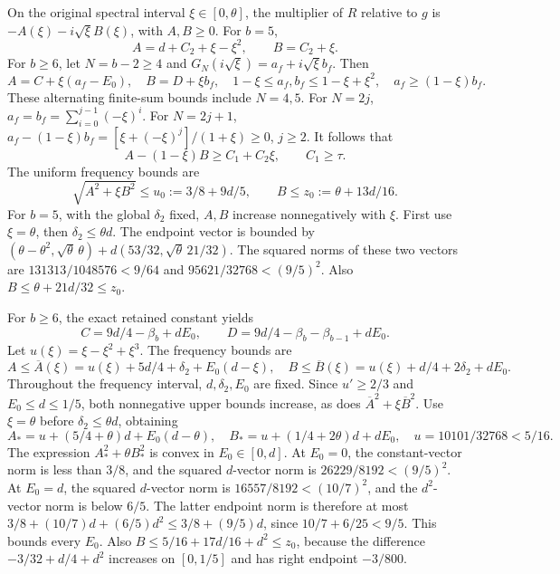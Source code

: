 On the original spectral interval \(\xi\in[0,\allowbreak \theta]\), the multiplier of \(R\) relative to \(g\) is
\(-A(\xi)-i\sqrt\xi B(\xi)\), with \(A,\allowbreak B\ge\allowbreak 0\).
For \(b=\allowbreak 5\),
\[
A=d+C_2+\xi-\xi^2,\qquad B=C_2+\xi.
\]
For \(b\ge\allowbreak 6\), let \(N=\allowbreak b-2\ge\allowbreak 4\) and
\(G_N(i\sqrt\xi)=\allowbreak a_f+i\sqrt\xi b_f\). Then
\[
A=C+\xi(a_f-E_0),\quad B=D+\xi b_f,
\quad 1-\xi\le a_f,b_f\le1-\xi+\xi^2,
\quad a_f\ge(1-\xi)b_f.
\tag{Q86.2.5}\label{eq:Q86:2.5}
\]
These alternating finite-sum bounds include \(N=\allowbreak 4,\allowbreak 5\).
For \(N=\allowbreak 2j\),
\(a_f=\allowbreak b_f=\allowbreak \sum_{i=\allowbreak 0}^{j-1}(-\xi)^i\).
For \(N=\allowbreak 2j+1\),
\(a_f-(1-\xi)b_f=\allowbreak [\xi+(-\xi)^j]/(1+\xi)\ge\allowbreak 0\), \(j\ge\allowbreak 2\).
It follows that
\[
A-(1-\xi)B\ge C_1+C_2\xi,\qquad C_1\ge\tau.
\tag{Q86.2.6}\label{eq:Q86:2.6}
\]
The uniform frequency bounds are
\[
\boxed{\sqrt{A^2+\xi B^2}\le u_0:=3/8+9d/5,
\qquad B\le z_0:=\theta+13d/16.}
\tag{Q86.2.7}\label{eq:Q86:2.7}
\]
For \(b=\allowbreak 5\), with the global \(\delta_2\) fixed, \(A,\allowbreak B\) increase nonnegatively with \(\xi\).
First use \(\xi=\allowbreak \theta\), then \(\delta_2\le\allowbreak \theta d\).
The endpoint vector is bounded by
\((\theta-\theta^2,\sqrt\theta\,\theta)
+d(53/32,\sqrt\theta\,21/32)\).
The squared norms of these two vectors are
\(131313/1048576<\allowbreak 9/64\) and \(95621/32768<\allowbreak (9/5)^2\).
Also \(B\le\allowbreak \theta+21d/32\le\allowbreak  z_0\).

For \(b\ge\allowbreak 6\), the exact retained constant yields
\[
C=9d/4-\beta_b+dE_0,\qquad
D=9d/4-\beta_b-\beta_{b-1}+dE_0.
\]
Let \(u(\xi)=\allowbreak \xi-\xi^2+\xi^3\). The frequency bounds are
\[
A\le\overline A(\xi)=u(\xi)+5d/4+\delta_2+E_0(d-\xi),
\quad
B\le\overline B(\xi)=u(\xi)+d/4+2\delta_2+dE_0.
\tag{Q86.2.8}\label{eq:Q86:2.8}
\]
Throughout the frequency interval, \(d,\allowbreak \delta_2,\allowbreak E_0\) are fixed.
Since \(u'\ge\allowbreak 2/3\) and \(E_0\le\allowbreak  d\le\allowbreak 1/5\), both nonnegative upper bounds increase, as does
\(\overline A^2+\xi\overline B^2\).
Use \(\xi=\allowbreak \theta\) before \(\delta_2\le\allowbreak \theta d\), obtaining
\[
A_* =u+(5/4+\theta)d+E_0(d-\theta),\quad
B_* =u+(1/4+2\theta)d+dE_0,\quad
u=10101/32768<5/16.
\]
The expression \(A_*^2+\theta B_*^2\) is convex in \(E_0\in[0,\allowbreak d]\).
At \(E_0=\allowbreak 0\), the constant-vector norm is less than \(3/8\), and the squared \(d\)-vector norm is
\(26229/8192<\allowbreak (9/5)^2\).
At \(E_0=\allowbreak d\), the squared \(d\)-vector norm is
\(16557/8192<\allowbreak (10/7)^2\), and the \(d^2\)-vector norm is below \(6/5\).
The latter endpoint norm is therefore at most
\(3/8+(10/7)d+(6/5)d^2\le\allowbreak 3/8+(9/5)d\), since
\(10/7+6/25<\allowbreak 9/5\).
This bounds every \(E_0\).
Also \(B\le\allowbreak 5/16+17d/16+d^2\le\allowbreak  z_0\), because the difference
\(-3/32+d/4+d^2\) increases on \([0,\allowbreak 1/5]\) and has right endpoint \(-3/800\).

